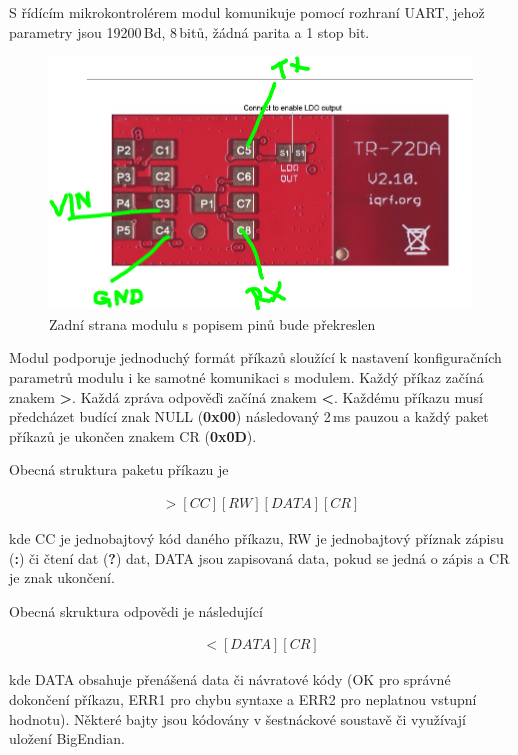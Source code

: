 S řídícím mikrokontrolérem modul komunikuje pomocí rozhraní UART, jehož parametry jsou 19200\,Bd, 8\,bitů, žádná parita a 1 stop bit.
		
 \begin{figure}[!h]
  \begin{center}
    \includegraphics[scale=0.4]{obrazky/modul_zada}
  \end{center}
  \caption{Zadní strana modulu s popisem pinů \colorbox[rgb]{0,1,0}{bude překreslen}}
\end{figure}

Modul podporuje jednoduchý formát příkazů sloužící k nastavení konfiguračních parametrů modulu i ke samotné komunikaci s modulem. Každý příkaz začíná znakem \textbf{\textgreater}. Každá zpráva odpověďi začíná znakem \textbf{\textless}. Každému příkazu musí předcházet budící znak NULL (\textbf{0x00}) následovaný 2\,ms pauzou a každý paket příkazů je ukončen znakem CR (\textbf{0x0D}). 

Obecná struktura\cite{iqrfmodul} paketu příkazu je 

\begin{eqnarray}
	>[CC][RW][DATA][CR]
\end{eqnarray}

kde CC je jednobajtový kód daného příkazu, RW je jednobajtový příznak zápisu (\textbf{:}) či čtení dat (\textbf{?}) dat, DATA jsou zapisovaná data, pokud se jedná o zápis a CR je znak ukončení.

Obecná skruktura odpovědi je následující

\begin{eqnarray}
	<[DATA][CR]
\end{eqnarray}

kde DATA obsahuje přenášená data či návratové kódy (OK pro správné dokončení příkazu, ERR1 pro chybu syntaxe a ERR2 pro neplatnou vstupní hodnotu). Některé bajty jsou kódovány v šestnáckové soustavě či využívají uložení BigEndian.

